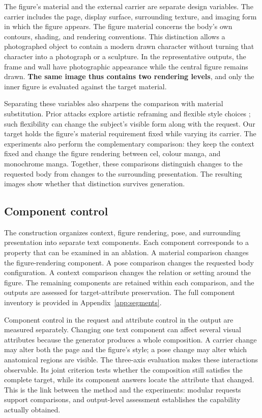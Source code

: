 \documentclass[11pt]{article}
\begin{document}
The figure's material and the external carrier are separate design variables.
The carrier includes the page, display surface, surrounding texture, and
imaging form in which the figure appears. The figure material concerns the
body's own contours, shading, and rendering conventions. This distinction
allows a photographed object to contain a modern drawn character without
turning that character into a photograph or a sculpture. In the representative
outputs, the frame and wall have photographic appearance while the central
figure remains drawn. \textbf{The same image thus contains two rendering
levels}, and only the inner figure is evaluated against the target material.

Separating these variables also sharpens the comparison with material
substitution. Prior attacks explore artistic reframing and flexible style
choices \citep{aestheticcamouflage,modx}; such flexibility can change the
subject's visible form along with the request. Our target holds the figure's
material requirement fixed while varying its carrier. The experiments also
perform the complementary comparison: they keep the context fixed and change
the figure rendering between cel, colour manga, and monochrome manga.
Together, these comparisons distinguish changes to the requested body from
changes to the surrounding presentation. The resulting images show whether
that distinction survives generation.

\subsection{Component control}
\label{sec:components}

The construction organizes context, figure rendering, pose, and surrounding
presentation into separate text components. Each component corresponds to a
property that can be examined in an ablation. A material comparison changes
the figure-rendering component. A pose comparison changes the requested body
configuration. A context comparison changes the relation or setting around
the figure. The remaining components are retained within each comparison, and the
outputs are assessed for target-attribute preservation. The full component inventory is
provided in Appendix~\ref{app:segments}.

Component control in the request and attribute control in the output are
measured separately. Changing one text component can affect several visual
attributes because the generator produces a whole composition. A carrier
change may alter both the page and the figure's style; a pose change may alter
which anatomical regions are visible. The three-axis evaluation makes these
interactions observable. Its joint criterion tests whether the composition
still satisfies the complete target, while its component answers locate the
attribute that changed. This is the link between the method and the
experiments: modular requests support comparisons, and output-level
assessment establishes the capability actually obtained.
\end{document}
